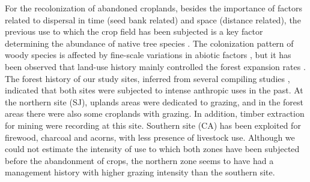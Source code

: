 For the recolonization of abandoned croplands, besides the importance of factors related to dispersal in time (seed bank related) and space (distance related), the previous use to which the crop field has been subjected is a key factor determining the abundance of native tree species \autocites{HermyVerheyen2007LegaciesPresentday,NavarroGonzalezetal2013WeightLanduse}. The colonization pattern of woody species is affected by fine-scale variations in abiotic factors \autocite{Milderetal2013ColonizationPatterns,Leverkusetal2016ShiftingDemographic}, but it has been observed that land-use history mainly controlled the forest expansion rates \autocites{AlvarezMartinezetal2014InfluenceLand,Perringetal2016GlobalEnvironmental}. The forest history of our study sites, inferred from several compiling studies \autocites{MorenoLlorcaetal2014CaracterizacionFuentes, Titos1997, PerezLuqueetal2020LanduseLegacies,MorenoLlorcaetal2016HistoricalAnalysis,MesaTorres2009,JimenezOlivenciaetal2015EvolucionUsos}, indicated that both sites were subjected to intense anthropic uses in the past. At the northern site (SJ), uplands areas were dedicated to grazing, and in the forest areas there were also some croplands with grazing. In addition, timber extraction for mining were recording at this site. Southern site (CA) has been exploited for firewood, charcoal and acorns, with less presence of livestock use. Although we could not estimate the intensity of use to which both zones have been subjected before the abandonment of crops, the northern zone seems to have had a management history with higher grazing intensity than the southern site. 
